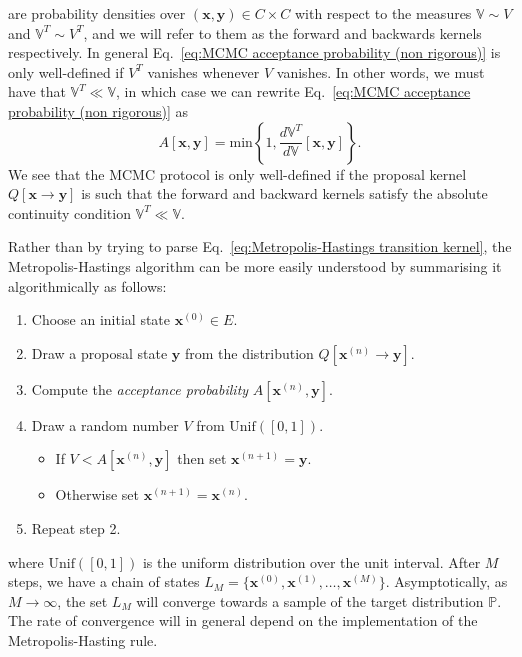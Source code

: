 are probability densities over $(\mathbf{x}, \mathbf{y}) \in C \times C$ with respect to the measures $\mathbb{V} \sim V$ and $\mathbb{V}^T \sim V^T$, and we will refer to them as the forward and backwards kernels respectively. In general Eq.~\ref{eq:MCMC acceptance probability (non rigorous)} is only well-defined if $V^T$ vanishes whenever $V$ vanishes. In other words, we must have that $\mathbb{V}^T \ll \mathbb{V}$, in which case we can rewrite Eq.~\ref{eq:MCMC acceptance probability (non rigorous)} as
\begin{equation} \label{eq:MCMC acceptance probability}
A[\mathbf{x}, \mathbf{y}] = \text{min}\left\{ 1,
\frac{d \mathbb{V}^T}{d \mathbb{V}}[\mathbf{x}, \mathbf{y}]
\right\}.
\end{equation}
We see that the MCMC protocol is only well-defined if the proposal kernel $Q[\mathbf{x} \to \mathbf{y}]$ is such that the forward and backward kernels satisfy the absolute continuity condition $\mathbb{V}^T \ll \mathbb{V}$.

Rather than by trying to parse Eq.~\ref{eq:Metropolis-Hastings transition kernel}, the Metropolis-Hastings algorithm can be more easily understood by summarising it algorithmically as follows:
\begin{enumerate}
\item Choose an initial state $\mathbf{x}^{(0)} \in E$.
\item Draw a proposal state $\mathbf{y}$ from the distribution $Q[\mathbf{x}^{(n)} \to \mathbf{y}]$.	
\item Compute the \textit{acceptance probability} $A[\mathbf{x}^{(n)}, \mathbf{y}]$.
\item Draw a random number $V$ from $\text{Unif}([0,1])$.
	\begin{itemize}
	\item If $V < A[\mathbf{x}^{(n)}, \mathbf{y}]$ then set $\mathbf{x}^{(n+1)} = \mathbf{y}$.
	\item Otherwise set  $\mathbf{x}^{(n+1)} = \mathbf{x}^{(n)}$.
	\end{itemize}
\item Repeat step 2.
\end{enumerate}
where $\text{Unif}([0,1])$ is the uniform distribution over the unit interval. After $M$ steps, we have a chain of states $L_M = \{ \mathbf{x}^{(0)}, \mathbf{x}^{(1)}, \dots, \mathbf{x}^{(M)} \}$. Asymptotically, as $M \to \infty$, the set $L_M$ will converge towards a sample of the target distribution $\mathbb{P}$. The rate of convergence will in general depend on the implementation of the Metropolis-Hasting rule.

